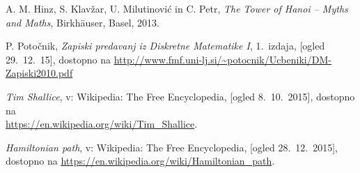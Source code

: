 \documentclass[11pt,a4paper]{article}
\theoremstyle{definition} %
\theoremstyle{plain} %
\begin{document}
\begin{thebibliography}{99}

 A. M. Hinz, S. Klavžar, U. Milutinović in C. Petr, \emph{The Tower of Hanoi – Myths and Maths}, Birkhäuser, Basel, 2013.

 P. Potočnik, \emph{Zapiski predavanj iz Diskretne Matematike I}, 1.~izdaja, [ogled 29.~12.~15], dostopno na \url{http://www.fmf.uni-lj.si/~potocnik/Ucbeniki/DM-Zapiski2010.pdf}

 \emph{Tim Shallice}, v: Wikipedia: The Free Encyclopedia, [ogled 8.~10.~2015], dostopno na\\ \url{https://en.wikipedia.org/wiki/Tim_Shallice}.

 \emph{Hamiltonian path}, v: Wikipedia: The Free Encyclopedia, [ogled 28.~12.~2015], dostopno na \url{https://en.wikipedia.org/wiki/Hamiltonian_path}.
\end{thebibliography}
\end{document}
